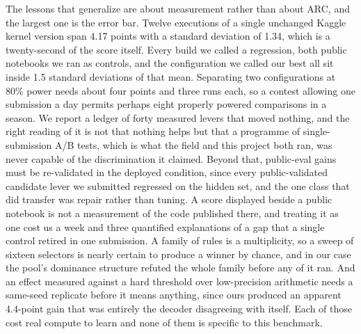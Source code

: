 \documentclass[11pt]{article}
\begin{document}
The lessons that generalize are about measurement rather than about ARC, and the largest one is the
error bar. Twelve executions of a single unchanged Kaggle kernel version span 4.17 points with a
standard deviation of 1.34, which is a twenty-second of the score itself. Every build we called a
regression, both public notebooks we ran as controls, and the configuration we called our best all
sit inside 1.5 standard deviations of that mean. Separating two configurations at 80\% power needs
about four points and three runs each, so a contest allowing one submission a day permits perhaps
eight properly powered comparisons in a season. We report a ledger of forty measured levers
that moved nothing, and the right reading of it is not that nothing helps but that a programme of
single-submission A/B tests, which is what the field and this project both ran, was never
capable of the discrimination it claimed. Beyond that, public-eval gains must be re-validated in the
deployed condition, since every public-validated candidate lever we submitted regressed on the hidden
set, and the one class that did transfer was repair rather than tuning. A score displayed beside a
public notebook is not a measurement of the code published there, and treating it as one cost us a
week and three quantified explanations of a gap that a single control retired in one submission. A
family of rules is a multiplicity, so a sweep of sixteen selectors is nearly certain to produce a
winner by chance, and in our case the pool's dominance structure refuted the whole family before any
of it ran. And an effect measured against a hard threshold over low-precision arithmetic needs a
same-seed replicate before it means anything, since ours produced an apparent 4.4-point gain that was
entirely the decoder disagreeing with itself. Each of those cost real compute to learn and none of
them is specific to this benchmark.
\end{document}
